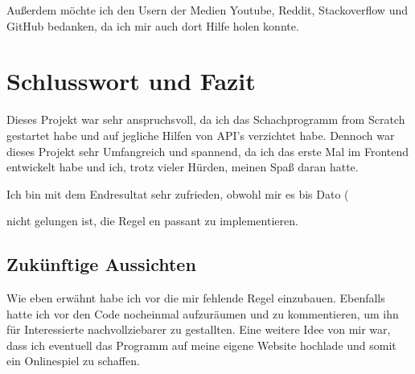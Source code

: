 \documentclass[a4paper, 10pt]{scrartcl}
\begin{document}
Außerdem möchte ich den Usern der Medien Youtube, Reddit, Stackoverflow und GitHub bedanken,
da ich mir auch dort Hilfe holen konnte. 

\section{Schlusswort und Fazit}
Dieses Projekt war sehr anspruchsvoll, da ich das Schachprogramm \glqq from Scratch\grqq{}
gestartet habe und auf jegliche Hilfen von API's verzichtet habe. Dennoch war dieses Projekt
sehr Umfangreich und spannend, da ich das erste Mal im Frontend entwickelt habe und ich,
trotz vieler Hürden, meinen Spaß daran hatte. 

Ich bin mit dem Endresultat sehr zufrieden, obwohl mir es bis Dato  (\date) 
nicht gelungen ist, die Regel \glqq en passant \grqq{} zu implementieren.

\subsection{Zukünftige Aussichten}
Wie eben erwähnt habe ich vor die mir fehlende Regel einzubauen. Ebenfalls hatte ich vor
den Code nocheinmal aufzuräumen und zu kommentieren, um ihn für Interessierte nachvollziebarer
zu gestallten. 
Eine weitere Idee von mir war, dass ich eventuell das Programm auf meine eigene Website
hochlade und somit ein Onlinespiel zu schaffen.

\end{document}
